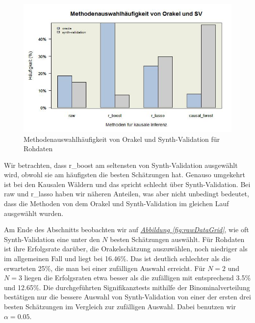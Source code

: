 \documentclass[12pt,a4paper,twoside]{scrartcl}
\numberwithin{equation}{section}
\newcommand{\reffig}[1]{\emph{\hyperref[#1]{Abbildung \ref*{#1}}}}
\begin{document}
\begin{center}
\begin{figure}[h]
    \centering
    \includegraphics[height=0.5\textwidth, width=1\textwidth]{figures/plots/rawDataBarplot.jpeg}
    \caption[Methodenauswahlhäufigkeit von Orakel und Synth-Validation für Rohdaten]{Methodenauswahlhäufigkeit von Orakel und Synth-Validation für Rohdaten}\label{fig:rawDataBarplot}
  \end{figure}
\end{center}

\noindent
Wir betrachten, dass r\_boost am seltensten von Synth-Validation ausgewählt wird, obwohl sie am häufigsten die besten Schätzungen hat. Genauso umgekehrt ist bei den Kausalen Wäldern und das spricht schlecht über Synth-Validation. Bei raw und r\_lasso haben wir näheren Anteilen, was aber nicht unbedingt bedeutet, dass die Methoden von dem Orakel und Synth-Validation im gleichen Lauf ausgewählt wurden. \par

\noindent
Am Ende des Abschnitts beobachten wir auf \reffig{fig:rawDataGrid}, wie oft Synth-Validation eine unter den $N$ besten Schätzungen auswählt. Für Rohdaten ist ihre Erfolgsrate darüber, die Orakelschätzung auszuwählen, noch niedriger als im allgemeinen Fall und liegt bei 16.46\%. Das ist deutlich schlechter als die erwarteten 25\%, die man bei einer zufälligen Auswahl erreicht. Für $N=2$ und $N=3$ liegen die Erfolgsraten etwa besser als die zufälligen mit entsprechend 3.5\% und 12.65\%. Die durchgeführten Signifikanztests mithilfe der Binominalverteilung bestätigen nur die bessere Auswahl von Synth-Validation von einer der ersten drei besten Schätzungen im Vergleich zur zufälligen Auswahl. Dabei benutzen wir $\alpha = 0.05$. \par
\end{document}
